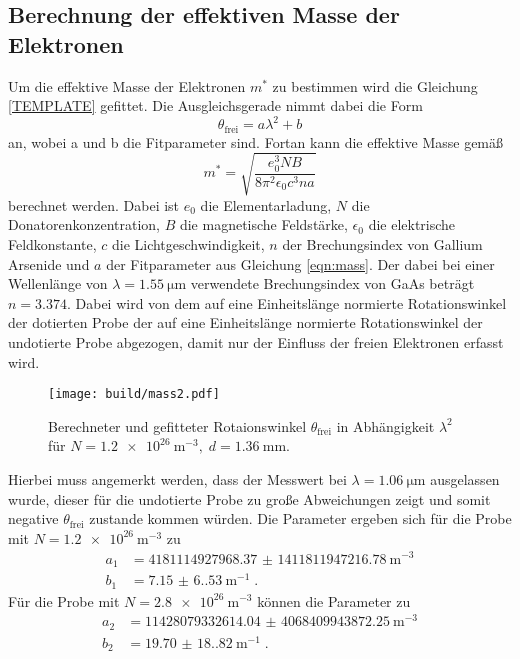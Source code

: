 \subsection{Berechnung der effektiven Masse der Elektronen}
Um die effektive Masse der Elektronen $m^*$ zu bestimmen wird die Gleichung \eqref{TEMPLATE} gefittet.
Die Ausgleichsgerade nimmt dabei die Form 
\begin{equation*}
    \theta_\text{frei} = a \lambda^2 + b
\end{equation*}
an, wobei a und b die Fitparameter sind.
Fortan kann die effektive Masse gemäß
\begin{equation}
    m^* = \sqrt{\frac{e_0^3 NB }{8 \pi^2 \epsilon_0 c^3 na}} \label{eqn:mass}
\end{equation}
berechnet werden.
Dabei ist $e_0$ die Elementarladung, $N$ die Donatorenkonzentration, $B$ die magnetische Feldstärke, $\epsilon_0$ die elektrische Feldkonstante,
$c$ die Lichtgeschwindigkeit, $n$ der Brechungsindex von Gallium Arsenide und $a$ der Fitparameter aus Gleichung \eqref{eqn:mass}.
Der dabei bei einer Wellenlänge von $\lambda = \qty{1.55}{\micro\metre}$ verwendete Brechungsindex von GaAs beträgt $n = 3.374$\cite{brechungsindex}.
Dabei wird von dem auf eine Einheitslänge normierte Rotationswinkel der dotierten Probe der auf eine Einheitslänge normierte Rotationswinkel der undotierte Probe abgezogen,
damit nur der Einfluss der freien Elektronen erfasst wird.
\begin{figure}
    \centering
    \texttt{[image: build/mass2.pdf]}
    \caption{Berechneter und gefitteter Rotaionswinkel $\theta_\text{frei}$ in Abhängigkeit $\lambda^2$ für $
    N=\qty{1.2e26}{\meter\tothe{-3}}, \; d = \qty{1,36}{\milli\meter}$.}
    \label{fig:mass2}
\end{figure}
Hierbei muss angemerkt werden, dass der Messwert bei $\lambda = \qty{1.06}{\micro\metre}$ ausgelassen wurde, dieser für die undotierte Probe zu große Abweichungen zeigt
und somit negative $ \theta_\text{frei}$ zustande kommen würden.
Die Parameter ergeben sich für die Probe mit $N=\qty{1.2e26}{\meter\tothe{-3}}$ zu
\begin{align*}
    a_1 &= \qty{4181114927968.37(141181194721678)}{\metre\tothe{-3}} \\
    b_1 &= \qty{7.15(6.53)}{\metre\tothe{-1}} \; \text{.}
\end{align*}
Für die Probe mit $N=\qty{2.8e26}{\meter\tothe{-3}}$ können die Parameter zu
\begin{align*}
    a_2 &= \qty{11428079332614.04(406840994387225)}{\metre\tothe{-3}} \\
    b_2 &= \qty{19.70(18.82)}{\metre\tothe{-1}} \; \text{.}
\end{align*}
